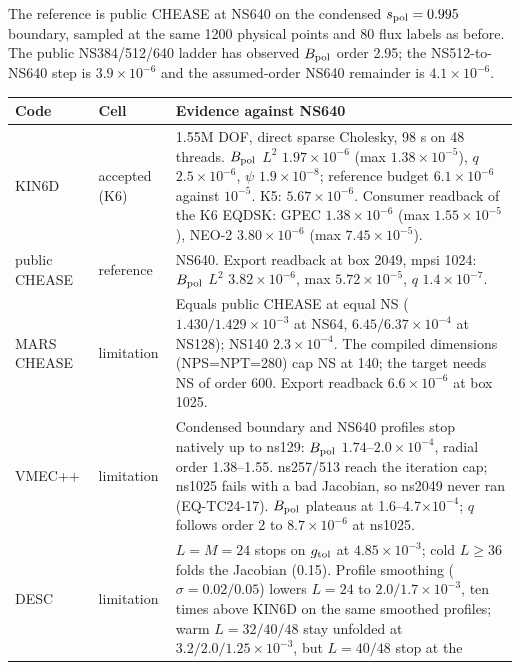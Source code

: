 \label{sec:ns640}
The reference is public CHEASE at NS640 on the condensed $s_{\rm pol}=0.995$ boundary,
sampled at the same 1200 physical points and 80 flux labels as before. The public
NS384/512/640 ladder has observed $B_{\rm pol}$ order 2.95; the NS512-to-NS640 step is
$3.9\times10^{-6}$ and the assumed-order NS640 remainder is $4.1\times10^{-6}$.

\begin{center}\small
\begin{tabular}{p{22mm}p{20mm}p{110mm}}
\toprule
Code & Cell & Evidence against NS640 \\
\midrule
KIN6D & accepted (K6) & 1.55M DOF, direct sparse Cholesky, 98 s on 48 threads.
$B_{\rm pol}$ $L^2$ $1.97\times10^{-6}$ (max $1.38\times10^{-5}$), $q$ $2.5\times10^{-6}$,
$\psi$ $1.9\times10^{-8}$; reference budget $6.1\times10^{-6}$ against $10^{-5}$.
K5: $5.67\times10^{-6}$. Consumer readback of the K6 EQDSK: GPEC $1.38\times10^{-6}$
(max $1.55\times10^{-5}$), NEO-2 $3.80\times10^{-6}$ (max $7.45\times10^{-5}$). \\
public CHEASE & reference & NS640. Export readback at box 2049, mpsi 1024:
$B_{\rm pol}$ $L^2$ $3.82\times10^{-6}$, max $5.72\times10^{-5}$, $q$ $1.4\times10^{-7}$. \\
MARS CHEASE & limitation & Equals public CHEASE at equal NS ($1.430/1.429\times10^{-3}$ at NS64,
$6.45/6.37\times10^{-4}$ at NS128); NS140 $2.3\times10^{-4}$. The compiled dimensions
(NPS=NPT=280) cap NS at 140; the target needs NS of order 600. Export readback
$6.6\times10^{-6}$ at box 1025. \\
VMEC++ & limitation & Condensed boundary and NS640 profiles stop natively up to ns129:
$B_{\rm pol}$ $1.74$--$2.0\times10^{-4}$, radial order 1.38--1.55. ns257/513 reach the
iteration cap; ns1025 fails with a bad Jacobian, so ns2049 never ran (EQ-TC24-17).
$B_{\rm pol}$ plateaus at 1.6--4.7$\times10^{-4}$; $q$ follows order 2 to
$8.7\times10^{-6}$ at ns1025. \\
DESC & limitation & $L=M=24$ stops on $g_{\rm tol}$ at $4.85\times10^{-3}$; cold $L\ge36$
folds the Jacobian (0.15). Profile smoothing ($\sigma=0.02/0.05$) lowers $L=24$ to
$2.0/1.7\times10^{-3}$, ten times above KIN6D on the same smoothed profiles; warm
$L=32/40/48$ stay unfolded at $3.2/2.0/1.25\times10^{-3}$, but $L=40/48$ stop at the

\end{tabular}
\end{center}
